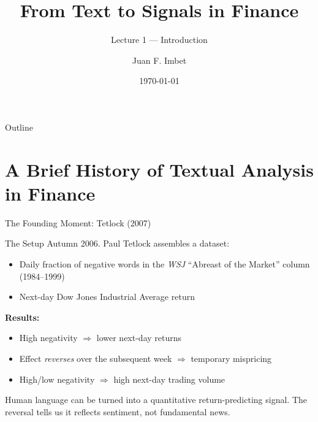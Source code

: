 \documentclass[9pt,t]{beamer}
\title{From Text to Signals in Finance}
\subtitle{Lecture 1 — Introduction}
\author{Juan F. Imbet}
\institute{Paris Dauphine -- PSL University}
\date{\today}
\begin{document}
\begin{frame}
  \titlepage
\end{frame}

\begin{frame}{Outline}
  \tableofcontents
\end{frame}

\section{A Brief History of Textual Analysis in Finance}

\begin{frame}{The Founding Moment: Tetlock (2007)}
  \begin{block}{The Setup}
    Autumn 2006. Paul Tetlock assembles a dataset:
    \begin{itemize}
      \item Daily fraction of negative words in the \textit{WSJ} ``Abreast of the Market'' column (1984--1999)
      \item Next-day Dow Jones Industrial Average return
    \end{itemize}
  \end{block}
  \medskip
  \textbf{Results:}
  \begin{itemize}
    \item High negativity $\Rightarrow$ lower next-day returns 
    \item Effect \emph{reverses} over the subsequent week $\Rightarrow$ temporary mispricing
    \item High/low negativity $\Rightarrow$ high next-day trading volume
  \end{itemize}
  \medskip
  \begin{bigpicture}
    Human language can be turned into a quantitative return-predicting signal.
    The reversal tells us it reflects sentiment, not fundamental news.
  \end{bigpicture}
\end{frame}
\end{document}
